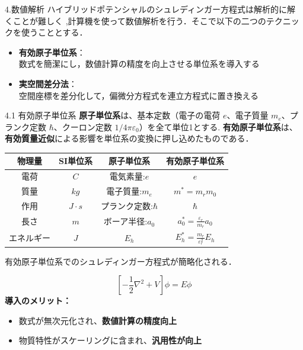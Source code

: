 \documentclass{beamer}
\begin{document}
\begin{frame}{4.数値解析}
ハイブリッドポテンシャルのシュレディンガー方程式は解析的に解くことが難しく
,計算機を使って数値解析を行う．そこで以下の二つのテクニックを使うこととする．


\begin{itemize}
  \item \textbf{有効原子単位系}：  \\
  \rightarrow 数式を簡潔にし，数値計算の精度を向上させる単位系を導入する
  \item \textbf{実空間差分法}：  \\
  \rightarrow 空間座標を差分化して，偏微分方程式を連立方程式に置き換える
\end{itemize}
\end{frame}
  \begin{frame}{4.1 有効原子単位系}
    \textbf{原子単位系}は、基本定数（電子の電荷 $e$、電子質量 $m_e$、プランク定数 $\hbar$、クーロン定数 $1/4\pi\varepsilon_0$）を全て単位1とする.
    \textbf{有効原子単位系}は、\textbf{有効質量近似}による影響を単位系の変換に押し込めたものである．
    \begin{center}
      \begin{tabular}{|c|c|c|c|}
      \hline
      \textbf{物理量} & \textbf{SI単位系} & \textbf{原子単位系} &\textbf{有効原子単位系}\\
      \hline
      電荷 & $C$ & 電気素量:$e$ &$e$ \\
      \hline
      質量 & $kg$ & 電子質量:$m_e$ &$m^*=m_r m_0$ \\
      \hline
      作用 & $J\cdot s$ & プランク定数:$\hbar$ & $\hbar$ \\
      \hline
      長さ & $m$ & ボーア半径:$a_0$ & $a_0^* = \frac{\varepsilon_r}{m_r} a_0$ \\
      \hline
      エネルギー & $J$ & $E_h$ & $E_h^* = \frac{m_r}{\varepsilon_r^2} E_h$  \\
      \hline
      \end{tabular}
    \end{center}
    有効原子単位系でのシュレディンガー方程式が簡略化される．

    \begin{equation} 
      \left[-\frac{1}{2}\nabla^2+V\right]\phi=E\phi
    \end{equation}  
      \textbf{導入のメリット：}
      \begin{itemize}
        \item 数式が無次元化され、\textbf{数値計算の精度向上}
        \item 物質特性がスケーリングに含まれ、\textbf{汎用性が向上}
      \end{itemize}
      
      \end{frame}
      
\end{document}

